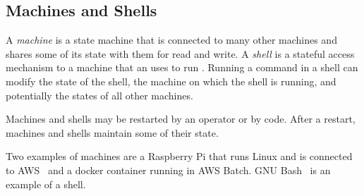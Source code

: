 \subsection{Machines and Shells}\label{machine}

A \emph{machine} is a state machine that is connected to many other machines and shares some of its state with them for read and write. A \emph{shell} is a stateful access mechanism to a machine that an  uses to run . Running a command in a shell can modify the state of the shell, the machine on which the shell is running, and potentially the states of all other machines. 

Machines and shells may be restarted by an operator or by code. After a restart, machines and shells maintain some of their state. 

Two examples of machines are a Raspberry Pi that runs Linux and is connected to AWS~ and a docker container running in AWS Batch. GNU Bash~ is an example of a shell.